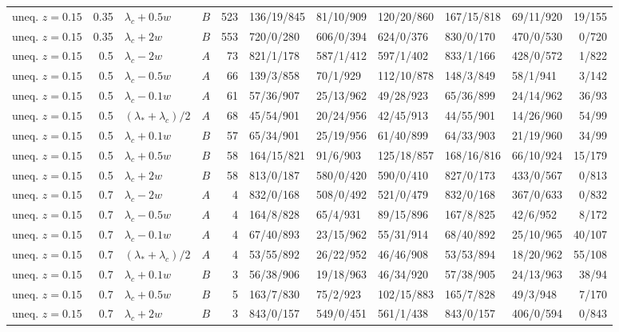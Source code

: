 \begin{longtable}{@{}lrllrlllllr@{}}
uneq. $z{=}0.15$ & 0.35 & $\lambda_c+0.5w$ & $B$ & 523 & 136/19/845 & 81/10/909 & 120/20/860 & 167/15/818 & 69/11/920 & 19/155\\
uneq. $z{=}0.15$ & 0.35 & $\lambda_c+2w$ & $B$ & 553 & 720/0/280 & 606/0/394 & 624/0/376 & 830/0/170 & 470/0/530 & 0/720\\
uneq. $z{=}0.15$ & 0.5 & $\lambda_c-2w$ & $A$ & 73 & 821/1/178 & 587/1/412 & 597/1/402 & 833/1/166 & 428/0/572 & 1/822\\
uneq. $z{=}0.15$ & 0.5 & $\lambda_c-0.5w$ & $A$ & 66 & 139/3/858 & 70/1/929 & 112/10/878 & 148/3/849 & 58/1/941 & 3/142\\
uneq. $z{=}0.15$ & 0.5 & $\lambda_c-0.1w$ & $A$ & 61 & 57/36/907 & 25/13/962 & 49/28/923 & 65/36/899 & 24/14/962 & 36/93\\
uneq. $z{=}0.15$ & 0.5 & $(\lambda_*+\lambda_c)/2$ & $A$ & 68 & 45/54/901 & 20/24/956 & 42/45/913 & 44/55/901 & 14/26/960 & 54/99\\
uneq. $z{=}0.15$ & 0.5 & $\lambda_c+0.1w$ & $B$ & 57 & 65/34/901 & 25/19/956 & 61/40/899 & 64/33/903 & 21/19/960 & 34/99\\
uneq. $z{=}0.15$ & 0.5 & $\lambda_c+0.5w$ & $B$ & 58 & 164/15/821 & 91/6/903 & 125/18/857 & 168/16/816 & 66/10/924 & 15/179\\
uneq. $z{=}0.15$ & 0.5 & $\lambda_c+2w$ & $B$ & 58 & 813/0/187 & 580/0/420 & 590/0/410 & 827/0/173 & 433/0/567 & 0/813\\
uneq. $z{=}0.15$ & 0.7 & $\lambda_c-2w$ & $A$ & 4 & 832/0/168 & 508/0/492 & 521/0/479 & 832/0/168 & 367/0/633 & 0/832\\
uneq. $z{=}0.15$ & 0.7 & $\lambda_c-0.5w$ & $A$ & 4 & 164/8/828 & 65/4/931 & 89/15/896 & 167/8/825 & 42/6/952 & 8/172\\
uneq. $z{=}0.15$ & 0.7 & $\lambda_c-0.1w$ & $A$ & 4 & 67/40/893 & 23/15/962 & 55/31/914 & 68/40/892 & 25/10/965 & 40/107\\
uneq. $z{=}0.15$ & 0.7 & $(\lambda_*+\lambda_c)/2$ & $A$ & 4 & 53/55/892 & 26/22/952 & 46/46/908 & 53/53/894 & 18/20/962 & 55/108\\
uneq. $z{=}0.15$ & 0.7 & $\lambda_c+0.1w$ & $B$ & 3 & 56/38/906 & 19/18/963 & 46/34/920 & 57/38/905 & 24/13/963 & 38/94\\
uneq. $z{=}0.15$ & 0.7 & $\lambda_c+0.5w$ & $B$ & 5 & 163/7/830 & 75/2/923 & 102/15/883 & 165/7/828 & 49/3/948 & 7/170\\
uneq. $z{=}0.15$ & 0.7 & $\lambda_c+2w$ & $B$ & 3 & 843/0/157 & 549/0/451 & 561/1/438 & 843/0/157 & 406/0/594 & 0/843\\

\end{longtable}
